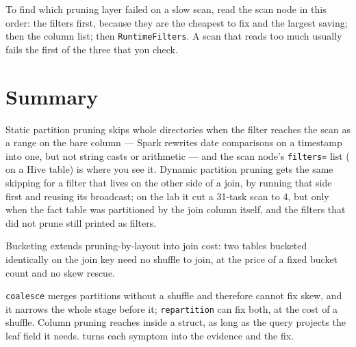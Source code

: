 \begin{tip}
To find which pruning layer failed on a slow scan, read the scan node in this
order: the filters first, because they are the cheapest to fix and the largest
saving; then the column list; then \texttt{RuntimeFilters}. A scan that reads too
much usually fails the first of the three that you check.
\end{tip}

\section{Summary}
\label{sec:pruning-summary}

Static partition pruning skips whole directories when the filter reaches the scan
as a range on the bare column --- Spark rewrites date comparisons on a timestamp
into one, but not string casts or arithmetic --- and the scan node's
\texttt{filters=} list ( on a Hive table) is where you
see it. Dynamic partition pruning gets the same skipping for a filter that lives
on the other side of a join, by running that side first and reusing its
broadcast; on the lab it cut a 31-task scan to 4, but only when the fact table
was partitioned by the join column itself, and the filters that did not prune
still printed as filters.

Bucketing extends pruning-by-layout into join cost: two
tables bucketed identically on the join key need no shuffle to join, at the
price of a fixed bucket count and no skew rescue.

\texttt{coalesce} merges partitions without a shuffle and therefore cannot fix
skew, and it narrows the whole stage before it; \texttt{repartition} can fix both,
at the cost of a shuffle. Column pruning reaches inside a struct, as long as the
query projects the leaf field it needs.  turns each
symptom into the evidence and the fix.

